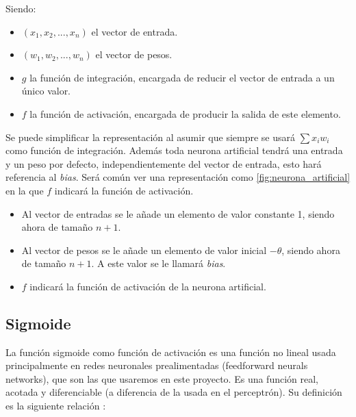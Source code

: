 
Siendo:
\begin{itemize}
\item $ (x_1, x_2, ...,x_n) $ el vector de entrada.
\item $ (w_1, w_2, ...,w_n) $ el vector de pesos.
\item $ g $ la función de integración, encargada de reducir el vector de entrada a un único valor.
\item $ f $ la función de activación, encargada de producir la salida de este elemento.
\end{itemize}

Se puede simplificar la representación al asumir que siempre se usará $ \sum x_i w_i $ como función de integración. Además toda neurona artificial tendrá una entrada y un peso por defecto, independientemente del vector de entrada, esto hará referencia al \textit{bias}. Será común ver una representación como \ref{fig:neurona_artificial} en la que $ f $ indicará la función de activación.


\begin{itemize}
\item Al vector de entradas se le añade un elemento de valor constante 1, siendo ahora de tamaño $ n+1 $.
\item Al vector de pesos se le añade un elemento de valor inicial $ -\theta $, siendo ahora de tamaño $ n+1 $. A este valor se le llamará \textit{bias}.
\item $ f $ indicará la función de activación de la neurona artificial.
\end{itemize}

\subsection{Sigmoide}\label{subsubsec:sigmoide}

La función sigmoide como función de activación es una función no lineal usada principalmente en redes neuronales prealimentadas (feedforward neurals networks), que son las que usaremos en este proyecto. Es una función real, acotada y diferenciable (a diferencia de la usada en el perceptrón). Su definición es la siguiente relación \cite{nwankpa2018activation}:

